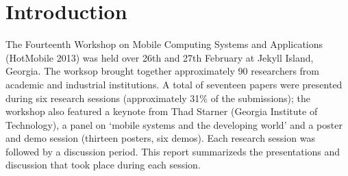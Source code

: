 \section{Introduction}
\label{sec:introduction}

The Fourteenth Workshop on Mobile Computing Systems and Applications (HotMobile 
2013) was held over 26th and 27th February at Jekyll Island, Georgia. The worksop 
brought together approximately 90 researchers from academic and industrial 
institutions. A total of seventeen papers were presented during six
research sessions (approximately 31\% of the submissions); the workshop
also featured a keynote from  Thad Starner (Georgia Institute of
Technology), a panel on `mobile systems and the developing world' and a
poster and demo session (thirteen posters, six demos). Each research
session was followed by a discussion period. This report summarizeds the
presentations and discussion that took place during each session.
